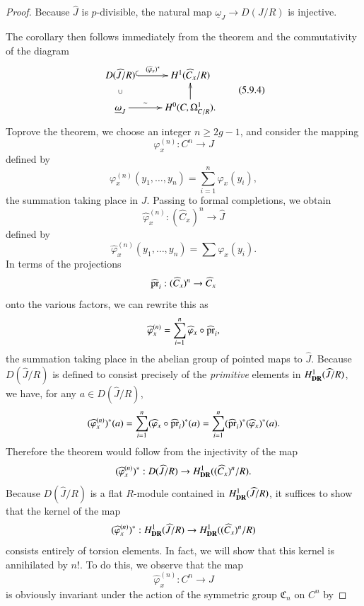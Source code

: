 \begin{proof}
Because $\widehat{J}$ is $p$-divisible, the natural map $\underline{\omega}_{J}\to D(J/R)$ is injective.

The corollary then follows immediately from the theorem and the commutativity of the diagram
\begin{equation*}
\vcenter{
\xymatrix@R=.5cm{
D(\widehat{J}/R)\ar@{^(->}[r]^-{(\widehat{\varphi}_{x})^{*}} & H^{1}(\widehat{C}_{x}/R)\\
\underline{\omega}_{J}\ar@{}[u]|{\cup}\ar[r]^-{\sim} & H^{0}(C,\Omega^{1}_{C/R}).\ar[u]
}}\tag{5.9.4}\label{art6-eq5.9.4}
\end{equation*}
To\pageoriginale prove the theorem, we choose an integer $n\geq 2g-1$, and consider the mapping
$$
\varphi^{(n)}_{x}:C^{n}\to J
$$
defined by
$$
\varphi^{(n)}_{x}(y_{1},\ldots,y_{n})=\sum\limits^{n}_{i=1}\varphi_{x}(y_{i}),
$$
the summation taking place in $J$. Passing to formal completions, we obtain 
$$
\widehat{\varphi}^{(n)}_{x}:(\widehat{C}_{x})^{n}\to \widehat{J}
$$
defined by
$$
\widehat{\varphi}^{(n)}_{x}(y_{1},\ldots,y_{n})=\sum \varphi_{x}(y_{i}).
$$
In terms of the projections
$$
\widehat{\operatorname{pr}}_{i}:(\widehat{C}_{x})^{n}\to \widehat{C}_{x}
$$
onto the various factors, we can rewrite this as
$$
\widehat{\varphi}^{(n)}_{x}=\sum\limits^{n}_{i=1}\widehat{\varphi}_{x}\circ \widehat{\operatorname{pr}}_{i},
$$
the summation taking place in the abelian group of pointed maps to $\widehat{J}$. Because $D(\widehat{J}/R)$ is defined to consist precisely of the {\em primitive} elements in $H^{1}_{\mathbf{DR}}(\widehat{J}/R)$, we have, for any $a\in D(\widehat{J}/R)$,
$$
(\widehat{\varphi}^{(n)}_{x})^{*}(a)=\sum\limits^{n}_{i=1}(\widehat{\varphi}_{x}\circ \widehat{\operatorname{pr}}_{i})^{*}(a)=\sum\limits^{n}_{i=1}(\widehat{\operatorname{pr}}_{i})^{*}(\widehat{\varphi}_{x})^{*}(a).
$$
Therefore the theorem would follow from the injectivity of the map
$$
(\widehat{\varphi}^{(n)}_{x})^{*}:D(\widehat{J}/R)\to H^{1}_{\mathbf{DR}}((\widehat{C}_{x})^{n}/R).
$$
Because $D(\widehat{J}/R)$ is a flat $R$-module contained in $H^{1}_{\mathbf{DR}}(\widehat{J}/R)$, it suffices to show that the kernel of the map
$$
(\widehat{\varphi}_{x}^{(n)})^{*}:H^{1}_{\mathbf{DR}}(\widehat{J}/R)\to H^{1}_{\mathbf{DR}}((\widehat{C}_{x})^{n}/R)
$$
consists entirely of torsion elements. In fact, we will show that this kernel is annihilated by $n!$. To do this, we observe that the map
$$
\widehat{\varphi}^{(n)}_{x}:C^{n}\to J
$$
is obviously invariant under the action of the symmetric group $\mathfrak{C}_{n}$ on $C^{n}$ by\pageoriginale
\end{proof}

